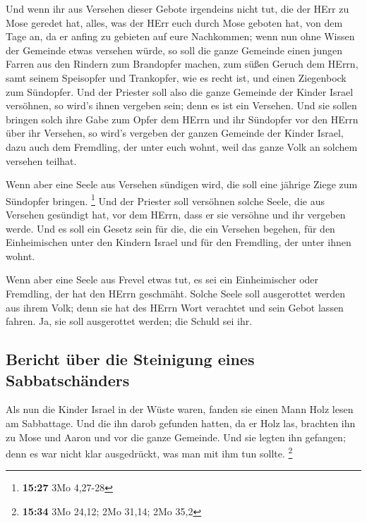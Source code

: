 Und wenn ihr aus Versehen dieser Gebote irgendeins nicht
tut, die der HErr zu Mose geredet hat,  alles, was der
HErr euch durch Mose geboten hat, von dem Tage an, da er anfing zu
gebieten auf eure Nachkommen;  wenn nun ohne Wissen der
Gemeinde etwas versehen würde, so soll die ganze Gemeinde einen jungen
Farren aus den Rindern zum Brandopfer machen, zum süßen Geruch dem
HErrn, samt seinem Speisopfer und Trankopfer, wie es recht ist, und
einen Ziegenbock zum Sündopfer.  Und der Priester soll
also die ganze Gemeinde der Kinder Israel versöhnen, so wird's ihnen
vergeben sein; denn es ist ein Versehen. Und sie sollen bringen solch
ihre Gabe zum Opfer dem HErrn und ihr Sündopfer vor den HErrn über ihr
Versehen,  so wird's vergeben der ganzen Gemeinde der
Kinder Israel, dazu auch dem Fremdling, der unter euch wohnt, weil das
ganze Volk an solchem versehen teilhat.

 Wenn aber eine Seele aus Versehen sündigen wird, die
soll eine jährige Ziege zum Sündopfer bringen. \footnote{\textbf{15:27}
  3Mo 4,27-28}  Und der Priester soll versöhnen solche
Seele, die aus Versehen gesündigt hat, vor dem HErrn, dass er sie
versöhne und ihr vergeben werde.  Und es soll ein Gesetz
sein für die, die ein Versehen begehen, für den Einheimischen unter den
Kindern Israel und für den Fremdling, der unter ihnen wohnt.

 Wenn aber eine Seele aus Frevel etwas tut, es sei ein
Einheimischer oder Fremdling, der hat den HErrn geschmäht. Solche Seele
soll ausgerottet werden aus ihrem Volk;  denn sie hat des
HErrn Wort verachtet und sein Gebot lassen fahren. Ja, sie soll
ausgerottet werden; die Schuld sei ihr.

\hypertarget{bericht-uxfcber-die-steinigung-eines-sabbatschuxe4nders}{%
\subsection{Bericht über die Steinigung eines
Sabbatschänders}\label{bericht-uxfcber-die-steinigung-eines-sabbatschuxe4nders}}

 Als nun die Kinder Israel in der Wüste waren, fanden sie
einen Mann Holz lesen am Sabbattage.  Und die ihn darob
gefunden hatten, da er Holz las, brachten ihn zu Mose und Aaron und vor
die ganze Gemeinde.  Und sie legten ihn gefangen; denn es
war nicht klar ausgedrückt, was man mit ihm tun sollte. \footnote{\textbf{15:34}
  3Mo 24,12; 2Mo 31,14; 2Mo 35,2}

